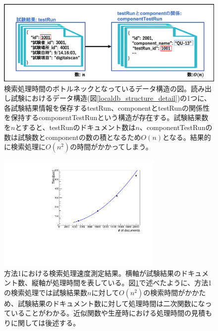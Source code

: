 \begin{figure}[bpt]
  \begin{center}
    \includegraphics[width=12cm]{search_python_testRun}
  \caption[検索処理時間のボトルネックとなっているデータ構造]{検索処理時間のボトルネックとなっているデータ構造の図。読み出し試験におけるデータ構造(図\ref{localdb_structure_detail})の1つに、各試験結果情報を保存するtestRun、componentとtestRunの関係性を保持するcomponentTestRunという構造が存在する。試験結果数を$n$とすると、testRunのドキュメント数は$n$、componentTestRunの数は試験数とcomponentの数の積となるため$O(n)$となる。結果的に検索処理に$O(n^2)$の時間がかかってしまう。}
  \label{search_python_testRun}
  \end{center}
\end{figure}

\begin{figure}[bpt]
  \begin{center}
    \includegraphics[width=8cm,angle=270]{result_python_list_search.pdf}
  \caption[方法1における検索処理速度測定結果]{方法1における検索処理速度測定結果。横軸が試験結果のドキュメント数、縦軸が処理時間を表している。図\ref{search_python_testRun}で述べたように、方法1の検索処理では試験結果数$n$に対して$O(n^2)$の検索時間がかかため、試験結果のドキュメント数に対して処理時間は二次関数になっていることがわかる。近似関数や生産時における処理時間の見積もりに関しては後述する。}
  \label{searching_time_python_list}
  \end{center}
\end{figure}

